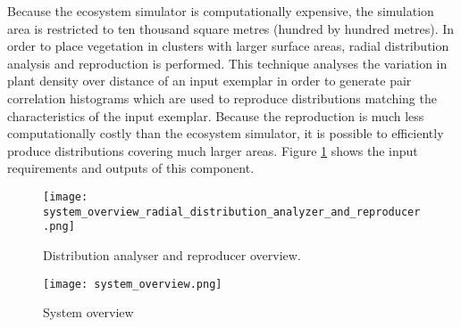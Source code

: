 Because the ecosystem simulator is computationally expensive, the simulation area is restricted to ten thousand square metres (hundred by hundred metres). In order to place vegetation in clusters with larger surface areas, radial distribution analysis and reproduction is performed. This technique analyses the variation in plant density over distance of an input exemplar in order to generate pair correlation histograms which are used to reproduce distributions matching the characteristics of the input exemplar. Because the reproduction is much less computationally costly than the ecosystem simulator, it is possible to efficiently produce distributions covering much larger areas. Figure \ref{fig:system_overview_distribution_analyser_and_reproducer} shows the input requirements and outputs of this component.

\begin{figure}
\center
	\texttt{[image: system\_overview\_radial\_distribution\_analyzer\_and\_reproducer.png]}
	\caption{ Distribution analyser and reproducer overview.}	
	\label{fig:system_overview_distribution_analyser_and_reproducer}
\end{figure}

\begin{figure}
\center
	\texttt{[image: system\_overview.png]}
	\caption{ System overview}	
	\label{fig:system_overview}
\end{figure}
